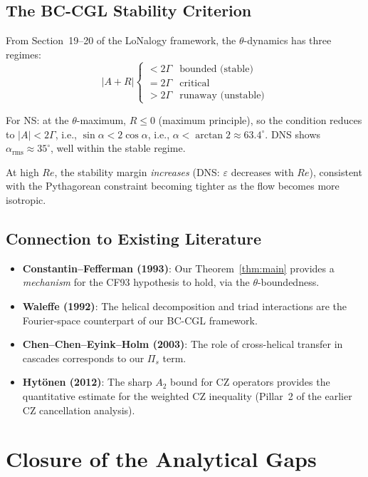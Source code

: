 \documentclass[12pt,a4paper]{article}
\theoremstyle{definition}
\begin{document}
\subsection{The BC-CGL Stability Criterion}

From Section~19--20 of the LoNalogy framework, the $\theta$-dynamics has three regimes:
\begin{equation}
  |A + R| \begin{cases} < 2\Gamma & \text{bounded (stable)} \\ = 2\Gamma & \text{critical} \\ > 2\Gamma & \text{runaway (unstable)} \end{cases}
\end{equation}

For NS: at the $\theta$-maximum, $R \leq 0$ (maximum principle), so the condition reduces to $|A| < 2\Gamma$, i.e., $\sin\alpha < 2\cos\alpha$, i.e., $\alpha < \arctan 2 \approx 63.4^\circ$. DNS shows $\alpha_{\mathrm{rms}} \approx 35^\circ$, well within the stable regime.

At high $Re$, the stability margin \emph{increases} (DNS: $\varepsilon$ decreases with $Re$), consistent with the Pythagorean constraint becoming tighter as the flow becomes more isotropic.

\subsection{Connection to Existing Literature}

\begin{itemize}
  \item \textbf{Constantin--Fefferman (1993)}: Our Theorem~\ref{thm:main} provides a \emph{mechanism} for the CF93 hypothesis to hold, via the $\theta$-boundedness.
  \item \textbf{Waleffe (1992)}: The helical decomposition and triad interactions are the Fourier-space counterpart of our BC-CGL framework.
  \item \textbf{Chen--Chen--Eyink--Holm (2003)}: The role of cross-helical transfer in cascades corresponds to our $\Pi_s$ term.
  \item \textbf{Hyt\"onen (2012)}: The sharp $A_2$ bound for CZ operators provides the quantitative estimate for the weighted CZ inequality (Pillar~2 of the earlier CZ cancellation analysis).
\end{itemize}

\section{Closure of the Analytical Gaps}\label{sec:closure}
\end{document}
